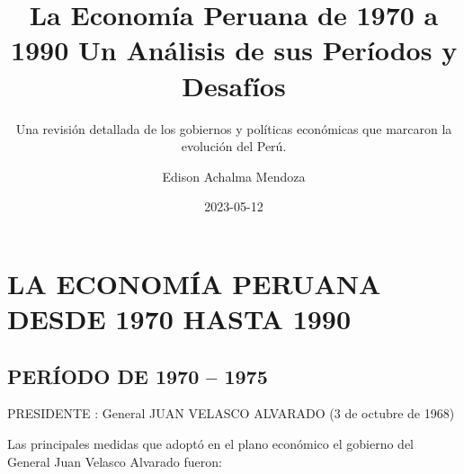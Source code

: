 \documentclass[
  letterpaper,
  DIV=11,
  numbers=noendperiod]{scrartcl}
\title{La Economía Peruana de 1970 a 1990 Un Análisis de sus Períodos y
Desafíos}
\subtitle{Una revisión detallada de los gobiernos y políticas económicas
que marcaron la evolución del Perú.}
\author{Edison Achalma Mendoza}
\date{2023-05-12}
\begin{document}
\maketitle
\ifdefined\Shaded\renewenvironment{Shaded}{\begin{tcolorbox}[frame hidden, sharp corners, interior hidden, enhanced, borderline west={3pt}{0pt}{shadecolor}, breakable, boxrule=0pt]}{\end{tcolorbox}}\fi

\hypertarget{la-economuxeda-peruana-desde-1970-hasta-1990}{%
\section{LA ECONOMÍA PERUANA DESDE 1970 HASTA
1990}\label{la-economuxeda-peruana-desde-1970-hasta-1990}}

\hypertarget{peruxedodo-de-1970-1975}{%
\subsection{PERÍODO DE 1970 -- 1975}\label{peruxedodo-de-1970-1975}}

PRESIDENTE : General JUAN VELASCO ALVARADO (3 de octubre de 1968)

Las principales medidas que adoptó en el plano económico el gobierno del
General Juan Velasco Alvarado fueron:
\end{document}
